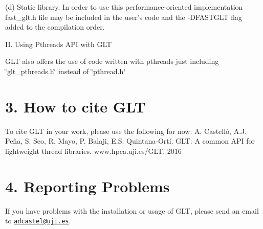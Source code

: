 (d) Static library. In order to use this performance-\/oriented implementation fast\-\_\-glt.\-h file may be included in the user's code and the -\/\-D\-F\-A\-S\-T\-G\-L\-T flag added to the compilation order.

I\-I. Using Pthreads A\-P\-I with G\-L\-T

G\-L\-T also offers the use of code written with pthreads just including \char`\"{}glt\-\_\-pthreads.\-h\char`\"{} instead of \char`\"{}pthread.\-h\char`\"{}





\section*{3. How to cite G\-L\-T }

To cite G\-L\-T in your work, please use the following for now\-: A. Castelló, A.\-J. Peña, S. Seo, R. Mayo, P. Balaji, E.\-S. Quintana-\/\-Ortí. G\-L\-T\-: A common A\-P\-I for lightweight thread libraries. www.\-hpca.\-uji.\-es/\-G\-L\-T. 2016 



\section*{4. Reporting Problems }

If you have problems with the installation or usage of G\-L\-T, please send an email to \href{mailto:adcastel@uji.es}{\tt adcastel@uji.\-es}. 
